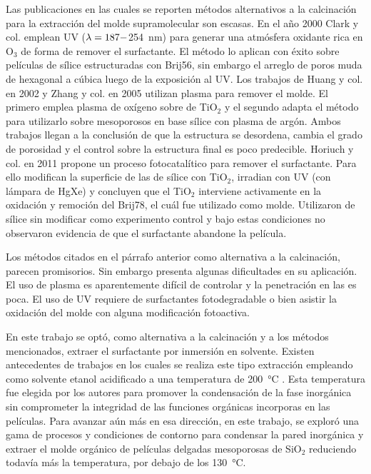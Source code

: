 	Las publicaciones en las cuales se reporten métodos alternativos a la calcinación para la extracción del molde supramolecular son escasas. En el año 2000 Clark y col.\cite{Clark2000} emplean UV ($\lambda\index{longitud de onda}=187-$\SI{254}{\nm}) para generar una atmósfera oxidante rica en O$_3$ de forma de remover el surfactante. El método lo aplican con éxito sobre películas de sílice estructuradas con Brij56, sin embargo el arreglo de poros muda de hexagonal a cúbica luego de la exposición al UV. Los trabajos de Huang y col. en 2002\cite{Huang2002} y Zhang y col. en 2005\cite{Zhang2005} utilizan plasma para remover el molde. El primero emplea plasma de oxígeno sobre \pdm\space de TiO$_2$ y el segundo adapta el método para utilizarlo sobre mesoporosos en base sílice con plasma de argón. Ambos trabajos llegan a la conclusión de que la estructura se desordena, cambia el grado de porosidad y el control sobre la estructura final es poco predecible. Horiuch y col.\cite{Horiuchi2011} en 2011 propone un proceso fotocatalítico para remover el surfactante. Para ello modifican la superficie de las \pdm\space de sílice con TiO$_2$, irradian con UV (con lámpara de HgXe) y concluyen que el TiO$_2$ interviene activamente en la oxidación y remoción del Brij78, el cuál fue utilizado como molde. Utilizaron \pdm\space de sílice sin modificar como experimento control y bajo estas condiciones no observaron evidencia de que el surfactante abandone la película.

	Los métodos citados en el párrafo anterior como alternativa a la calcinación, parecen promisorios. Sin embargo presenta algunas dificultades en su aplicación. El uso de plasma es aparentemente difícil de controlar y la penetración en las \pdm\space es poca. El uso de UV requiere de surfactantes fotodegradable o bien asistir la oxidación del molde con alguna modificación fotoactiva.

	En este trabajo se optó, como alternativa a la calcinación y a los métodos mencionados, extraer el surfactante por inmersión en solvente. Existen antecedentes de trabajos en los cuales se realiza este tipo extracción empleando como solvente etanol acidificado a una temperatura de \SI{200}{\celsius} \cite{Angelome2008,Calvo20210,Calvo2010,Fuertes2009}. Esta temperatura fue elegida por los autores para promover la condensación de la fase inorgánica sin comprometer la integridad de las funciones orgánicas incorporas en las películas. Para avanzar aún más en esa dirección, en este trabajo, se exploró una gama de procesos y condiciones de contorno para condensar la pared inorgánica y extraer el molde orgánico de películas delgadas mesoporosas de SiO$_2$ reduciendo todavía más la temperatura, por debajo de los \SI{130}{\celsius}.

